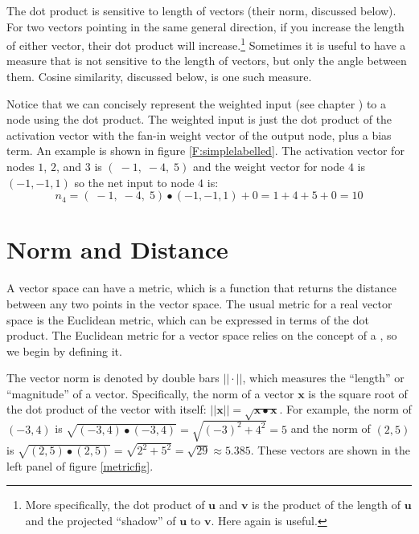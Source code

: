The dot product is sensitive to length of vectors (their norm, discussed below). For two vectors pointing in the same general direction, if you increase the length of either vector, their dot product will increase.\footnote{More specifically, the dot product of $\textbf{u}$ and $\textbf{v}$ is the product of the length of $\textbf{u}$ and the projected ``shadow'' of $\textbf{u}$ to $\textbf{v}$. Here again  is useful.} Sometimes it is useful to have a measure that is not sensitive to the length of vectors, but only the angle between them. Cosine similarity, discussed below, is one such measure.

   Notice that we can concisely represent the weighted input (see chapter 
) to a node using the dot product. The weighted input 
is just the dot product of the activation vector with the fan-in weight vector 
of the output node, plus a bias term. An example is shown in figure 
\ref{F:simplelabelled}. The activation vector for nodes $1$, $2$, and $3$ is 
$(\; -1,\; -4,\; 5)$ and the weight vector for node $4$ is $(-1,-1,1)$ so the 
net input to node $4$ is:
\begin{equation*}
n_4 = (\; -1,\; -4,\; 5) \bullet (-1,-1,1) + 0  = 1 + 4 + 5 + 0 = 10
\end{equation*}
 
\section{Norm and Distance}\label{metricSpace}

   A vector space can have a metric, which is a function that returns the 
distance between any two points in the vector space. The usual metric for a 
real vector space is the Euclidean metric, which can be expressed in terms of 
the dot product. The Euclidean metric for a vector space relies on the concept of a , so we begin by defining it.

The vector norm is denoted by double bars $|| \cdot ||$, which measures the ``length'' or 
``magnitude'' of a vector. Specifically, the norm of a vector $\mathbf{x}$ is 
the square root of the dot product of the vector with itself: $||\mathbf{x}|| = 
\sqrt{\mathbf{x} \bullet \mathbf{x}}$. For example, the norm of $(-3,4)$ is $\sqrt{(-3,4) \bullet (-3,4)}  = \sqrt{(-3)^2+4^2} = 5$ and the norm 
of $(2,5)$ is $ \sqrt{(2,5) \bullet (2,5)} = \sqrt{2^2+5^2} =  \sqrt{29} \approx 5.385$. These vectors are 
shown in the left panel of figure \ref{metricfig}. 

